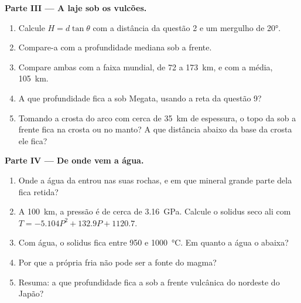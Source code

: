 \begin{problem}
\medskip
\noindent\textbf{Parte III --- A laje sob os vulcões.}
\begin{enumerate}[resume]
  \item Calcule $H = d\tan\theta$ com a distância da questão 2 e um mergulho
        de \ang{20}.
  \item Compare-a com a profundidade mediana sob a frente.
  \item Compare ambas com a faixa mundial, de 72 a \qty{173}{km}, e com a
        média, \qty{105}{km}.
  \item A que profundidade fica a  sob Megata, usando a reta da
        questão 9?
  \item Tomando a crosta do arco com cerca de \qty{35}{km} de espessura, o
        topo da  sob a frente fica na crosta ou no manto? A que
        distância abaixo da base da crosta ele fica?
\end{enumerate}

\medskip
\noindent\textbf{Parte IV --- De onde vem a água.}
\begin{enumerate}[resume]
  \item Onde a água da  entrou nas suas rochas, e em que mineral grande
        parte dela fica retida?
  \item A \qty{100}{km}, a pressão é de cerca de \qty{3.16}{GPa}. Calcule o
        solidus seco ali com $T = -5.104P^2 + 132.9P + 1120.7$.
  \item Com água, o solidus fica entre 950 e \qty{1000}{\celsius}. Em quanto
        a água o abaixa?
  \item Por que a própria  fria não pode ser a fonte do magma?
  \item Resuma: a que profundidade fica a  sob a frente vulcânica do
        nordeste do Japão?
\end{enumerate}
\end{problem}
